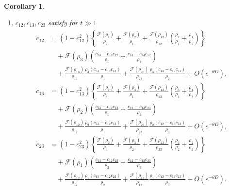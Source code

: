 \documentclass[reqno]{amsart}
\theoremstyle{plain}
\newtheorem{corollary}[theorem]{Corollary}
\theoremstyle{definition}
\numberwithin{equation}{section}
\newcommand{\1}{\mathbbm{1}}
\begin{document}
\begin{corollary}
\begin{enumerate}
\item $c_{12},c_{13},c_{23}$ satisfy for $t\gg 1$
\begin{align}\label{ces10210}
\begin{aligned}
\dot{c}_{12}&=(1-c_{12}^2)\left\{\frac{\mathcal{F}(\rho_1)}{\rho_2}+\frac{\mathcal{F}(\rho_2)}{\rho_1}+\frac{\mathcal{F}(\rho_{12})}{\rho_{12}}\left(\frac{\rho_2}{\rho_1}+\frac{\rho_1}{\rho_2}\right)\right\}
\\
&\quad+\mathcal{F}(\rho_3)\left( \frac{c_{23}-c_{13}c_{12}}{\rho_1}+\frac{c_{13}-c_{23}c_{12}}{\rho_2}\right)
\\
&\quad+\frac{\mathcal{F}(\rho_{13})}{\rho_{13}}\frac{\rho_3(c_{23}-c_{12}c_{13})}{\rho_1}+\frac{\mathcal{F}(\rho_{23})}{\rho_{23}}\frac{\rho_3(c_{13}-c_{12}c_{23})}{\rho_2}+O\left(e^{-\theta D}\right),
\\
\dot{c}_{13}&=(1-c_{13}^2)\left\{\frac{\mathcal{F}(\rho_1)}{\rho_3}+\frac{\mathcal{F}(\rho_3)}{\rho_1}+\frac{\mathcal{F}(\rho_{13})}{\rho_{13}}\left(\frac{\rho_3}{\rho_1}+\frac{\rho_1}{\rho_3}\right)\right\}
\\
&\quad+\mathcal{F}(\rho_2)\left( \frac{c_{23}-c_{12}c_{13}}{\rho_1}+\frac{c_{12}-c_{13}c_{23}}{\rho_3}\right)
\\
&\quad+\frac{\mathcal{F}(\rho_{12})}{\rho_{12}}\frac{\rho_2(c_{23}-c_{12}c_{13})}{\rho_1}+\frac{\mathcal{F}(\rho_{23})}{\rho_{23}}\frac{\rho_2(c_{12}-c_{13}c_{23})}{\rho_3}+O\left(e^{-\theta D}\right),
\\
\dot{c}_{23}&=(1-c_{23}^2)\left\{\frac{\mathcal{F}(\rho_2)}{\rho_3}+\frac{\mathcal{F}(\rho_3)}{\rho_2}+\frac{\mathcal{F}(\rho_{23})}{\rho_{23}}\left(\frac{\rho_3}{\rho_2}+\frac{\rho_2}{\rho_3}\right)\right\}
\\
&\quad+\mathcal{F}(\rho_1)\left( \frac{c_{13}-c_{12}c_{23}}{\rho_2}+\frac{c_{12}-c_{13}c_{23}}{\rho_3}\right)
\\
&\quad+\frac{\mathcal{F}(\rho_{12})}{\rho_{12}}\frac{\rho_1(c_{13}-c_{12}c_{23})}{\rho_2}+\frac{\mathcal{F}(\rho_{13})}{\rho_{13}}\frac{\rho_1(c_{12}-c_{13}c_{23})}{\rho_3}+O\left(e^{-\theta D}\right).
\end{aligned}
\end{align}


\end{enumerate}
\end{corollary}
\end{document}

